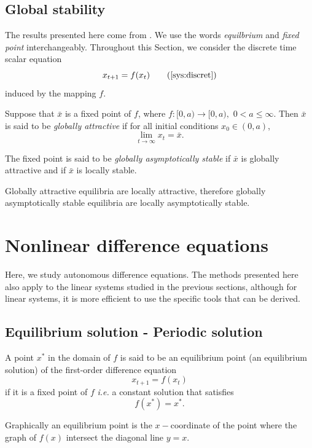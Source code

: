 \subsection{Global stability}
\label{sec:global_stability}
The results presented here come from \cite{Allen2007}. We use the words \emph{equilbrium} and \emph{fixed point} interchangeably. Throughout this Section, we consider the discrete time scalar equation
\begin{equation}
x_{t+1}=f(x_t) \tag{\ref{sys:discret}}
\end{equation}
induced by the mapping $f$.

\begin{definition}
Suppose that $\bar x$ is a fixed point of $f$,
where $f: [0,a)\rightarrow [0,a),$ $0<a\leq \infty$. Then $\bar x$ is said to be \emph{globally attractive} if for all initial conditions $x_0\in (0,a)$, $$\lim_{t\rightarrow \infty}x_t=\bar x.$$
\end{definition}

\begin{definition}
The fixed point is said to be \emph{globally asymptotically stable} if $\bar x$ is globally attractive and if $\bar x$ is locally stable.
\end{definition}
Globally attractive equilibria are locally attractive, therefore globally asymptotically stable equilibria are locally asymptotically stable.






\section{Nonlinear difference equations}
Here, we study autonomous difference equations. The methods presented here also apply to the linear systems studied in the previous sections, although for linear systems, it is more efficient to use the specific tools that can be derived.

\subsection{Equilibrium solution - Periodic solution}
\begin{definition}\label{def:fixedpoint}
A point $x^*$ in the domain of $f$ is said to be an equilibrium point (an equilibrium solution) of the first-order difference equation $$x_{t+1}=f(x_t)$$ if it is a fixed point of $f$ \emph{i.e.} a constant solution that satisfies
$$f(x^*)=x^*.$$
\end{definition}
Graphically an equilibrium point is the $x-$coordinate of the point where the graph of $f(x)$ intersect the diagonal line $y=x$.


